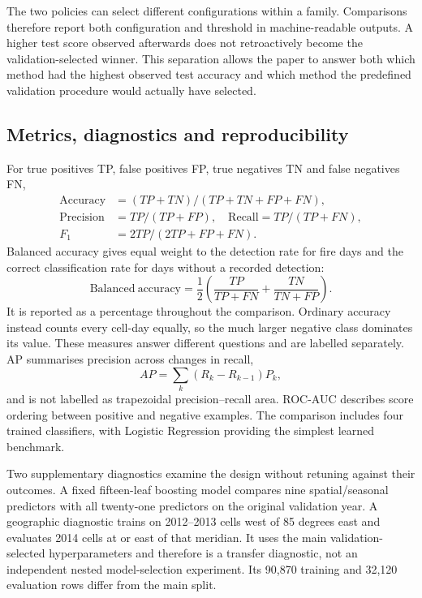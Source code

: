 \documentclass[conference,a4paper]{IEEEtran}
\begin{document}
The two policies can select different configurations within a family. Comparisons therefore report both configuration and threshold in machine-readable outputs. A higher test score observed afterwards does not retroactively become the validation-selected winner. This separation allows the paper to answer both which method had the highest observed test accuracy and which method the predefined validation procedure would actually have selected.

\subsection{Metrics, diagnostics and reproducibility}
For true positives TP, false positives FP, true negatives TN and false negatives FN,
\begin{align}
\mathrm{Accuracy}&=(TP+TN)/(TP+TN+FP+FN),\\
\mathrm{Precision}&=TP/(TP+FP),\quad
\mathrm{Recall}=TP/(TP+FN),\\
F_1&=2TP/(2TP+FP+FN).
\end{align}
Balanced accuracy gives equal weight to the detection rate for fire days and the correct classification rate for days without a recorded detection:
\begin{equation}
\mathrm{Balanced\ accuracy}=\frac{1}{2}\left(\frac{TP}{TP+FN}+\frac{TN}{TN+FP}\right).
\end{equation}
It is reported as a percentage throughout the comparison. Ordinary accuracy instead counts every cell-day equally, so the much larger negative class dominates its value. These measures answer different questions and are labelled separately. AP summarises precision across changes in recall,
\begin{equation}
AP=\sum_k (R_k-R_{k-1})P_k,
\end{equation}
and is not labelled as trapezoidal precision--recall area. ROC-AUC describes score ordering between positive and negative examples. The comparison includes four trained classifiers, with Logistic Regression providing the simplest learned benchmark.

Two supplementary diagnostics examine the design without retuning against their outcomes. A fixed fifteen-leaf boosting model compares nine spatial/seasonal predictors with all twenty-one predictors on the original validation year. A geographic diagnostic trains on 2012--2013 cells west of 85 degrees east and evaluates 2014 cells at or east of that meridian. It uses the main validation-selected hyperparameters and therefore is a transfer diagnostic, not an independent nested model-selection experiment. Its 90,870 training and 32,120 evaluation rows differ from the main split.
\end{document}
